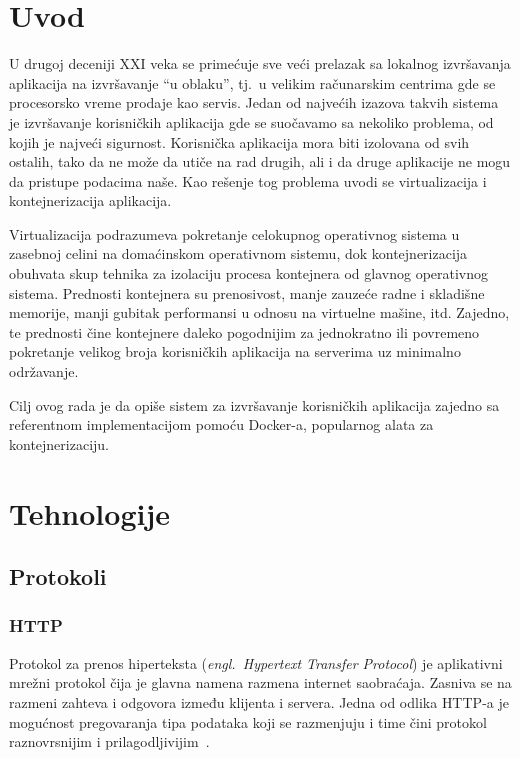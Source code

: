 \documentclass[12pt]{report}
\newcommand\frontmatter{
    \cleardoublepage{}
    \pagenumbering{Roman}
    \setlength{\parskip}{0pt}
}
\newcommand\mainmatter{
    \cleardoublepage{}
    \pagenumbering{arabic}
    \setlength{\parskip}{6pt}
}
\begin{document}
\frontmatter{}


\tableofcontents
\listoffigures
\printglossary[type=\acronymtype]

\mainmatter{}
\chapter{Uvod}
U drugoj deceniji XXI veka se primećuje sve veći prelazak sa lokalnog izvršavanja aplikacija na izvršavanje ``u oblaku'', tj.\ u velikim računarskim centrima gde se procesorsko vreme prodaje kao servis. Jedan od najvećih izazova takvih sistema je izvršavanje korisničkih aplikacija gde se suočavamo sa nekoliko problema, od kojih je najveći sigurnost. Korisnička aplikacija mora biti izolovana od svih ostalih, tako da ne može da utiče na rad drugih, ali i da druge aplikacije ne mogu da pristupe podacima naše. Kao rešenje tog problema uvodi se virtualizacija i kontejnerizacija aplikacija.

Virtualizacija podrazumeva pokretanje celokupnog operativnog sistema u zasebnoj celini na domaćinskom operativnom sistemu, dok kontejnerizacija obuhvata skup tehnika za izolaciju procesa kontejnera od glavnog operativnog sistema. Prednosti kontejnera su prenosivost, manje zauzeće radne i skladišne memorije, manji gubitak performansi u odnosu na virtuelne mašine, itd. Zajedno, te prednosti čine kontejnere daleko pogodnijim za jednokratno ili povremeno pokretanje velikog broja korisničkih aplikacija na serverima uz minimalno održavanje.

Cilj ovog rada je da opiše sistem za izvršavanje korisničkih aplikacija zajedno sa referentnom implementacijom pomoću Docker-a, popularnog alata za kontejnerizaciju.

\chapter{Tehnologije}
\section{Protokoli}
\subsection{HTTP}
Protokol za prenos hiperteksta (\textit{engl.\ Hypertext Transfer Protocol}) je aplikativni mrežni protokol čija je glavna namena razmena internet saobraćaja. Zasniva se na razmeni zahteva i odgovora između klijenta i servera. Jedna od odlika \acrshort{HTTP}-a je mogućnost pregovaranja tipa podataka koji se razmenjuju i time čini protokol raznovrsnijim i prilagodljivijim~\cite{http}.
\end{document}
